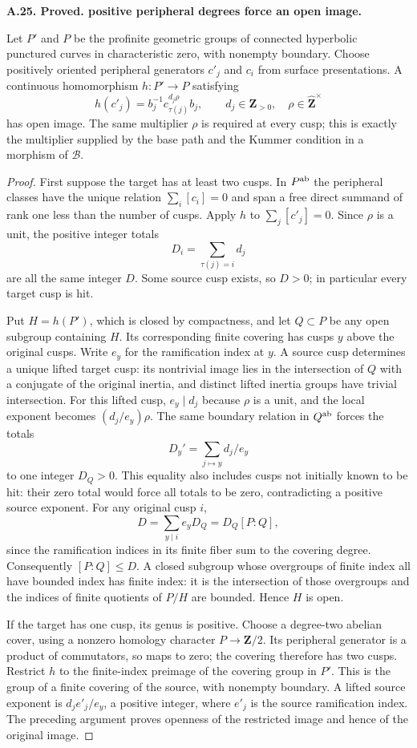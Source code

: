\documentclass[11pt,oneside]{article}
\makeatletter
\newcounter{statementanchor}
\newenvironment{statement}[3]{%
 \refstepcounter{statementanchor}\def\@currentlabel{#1}%
 \par\addvspace{9pt}\noindent
 \textbf{#1. #2. #3.}\par\nobreak\noindent\ignorespaces
}{\par\addvspace{5pt}}
\makeatother
\begin{document}
\begin{statement}{A.25}{Proved}{positive peripheral degrees force an open image}
\label{st:A.25}
\label{A:positive-degree-open}
Let $P'$ and $P$ be the profinite geometric groups of
connected hyperbolic punctured curves in characteristic
zero, with nonempty boundary.  Choose positively oriented
peripheral generators $c'_j$ and $c_i$ from surface
presentations.  A continuous homomorphism $h:P'\to P$
satisfying
\[
 h(c'_j)=b_j^{-1}c_{\tau(j)}^{d_j\rho}b_j,
 \qquad d_j\in\mathbf Z_{>0},\quad
 \rho\in\widehat{\mathbf Z}^{\times}
\]
has open image.  The same multiplier $\rho$ is required
at every cusp; this is exactly the multiplier supplied
by the base path and the Kummer condition in a
morphism of $\mathcal B$.
\end{statement}
\begin{proof}
First suppose the target has at least two cusps.
In $P^{\rm ab}$ the peripheral classes have the unique
relation $\sum_i[c_i]=0$ and span a free direct summand
of rank one less than the number of cusps.  Apply $h$
to $\sum_j[c'_j]=0$.  Since $\rho$ is a unit, the
positive integer totals
\[
                   D_i=\sum_{\tau(j)=i}d_j
\]
are all the same integer $D$.  Some source cusp exists,
so $D>0$; in particular every target cusp is hit.

Put $H=h(P')$, which is closed by compactness, and
let $Q\subset P$ be any open subgroup containing $H$.
Its corresponding finite covering has cusps $y$ above
the original cusps.  Write $e_y$ for the ramification
index at $y$.  A source cusp determines a unique lifted
target cusp: its nontrivial image lies in the
intersection of $Q$ with a conjugate of the original
inertia, and distinct lifted inertia groups have
trivial intersection.  For this lifted cusp,
$e_y\mid d_j$ because $\rho$ is a unit, and the local
exponent becomes $(d_j/e_y)\rho$.  The same boundary
relation in $Q^{\rm ab}$ forces the totals
\[
             D_y'=\sum_{j\mapsto y}d_j/e_y
\]
to one integer $D_Q>0$.  This equality also includes
cusps not initially known to be hit: their zero total
would force all totals to be zero, contradicting a
positive source exponent.  For any original cusp $i$,
\[
 D=\sum_{y\mid i} e_yD_Q
   =D_Q[P:Q],
\]
since the ramification indices in its finite fiber sum
to the covering degree.  Consequently $[P:Q]\le D$.
A closed subgroup whose overgroups of finite index all
have bounded index has finite index: it is the
intersection of those overgroups and the indices of
finite quotients of $P/H$ are bounded.  Hence $H$ is
open.

If the target has one cusp, its genus is positive.
Choose a degree-two abelian cover, using a nonzero
homology character $P\to\mathbf Z/2$.  Its peripheral
generator is a product of commutators, so maps to zero;
the covering therefore has two cusps.  Restrict $h$ to
the finite-index preimage of the covering group in
$P'$.  This is the group of a finite covering of the
source, with nonempty boundary.  A lifted source
exponent is $d_j e'_j/e_y$, a positive integer, where
$e'_j$ is the source ramification index.  The preceding
argument proves openness of the restricted image and
hence of the original image.
\end{proof}
\end{document}
